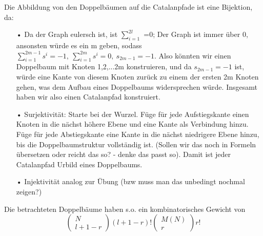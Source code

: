 \documentclass[a4paper, 11pt]{scrreprt}
\newcommand{\NN}{\mathbb{N}}
\begin{document}
Die Abbildung von den Doppelbäumen auf die Catalanpfade ist eine Bijektion, da:
\begin{itemize}
 \item[•]Da der Graph eulersch ist, ist $ \sum_{i=1}^{2l} $ =0; Der Graph ist immer über 0, ansonsten würde es ein m geben, sodass $ \sum_{i=1}^{2m-1}s^{i}=-1, ~\sum_{i=1}^{2m}s^{i}=0, ~ s_{2m-1}=-1  $. Also könnten wir einen Doppelbaum mit Knoten {1,2,...2m} konstruieren, und da $ s_{2m-1}=-1  $ ist, würde eine Kante von diesem Knoten zurück zu einem der ersten 2m Knoten gehen, was dem Aufbau eines Doppelbaums widersprechen würde. Insgesamt haben wir also einen Catalanpfad konstruiert. 
 \item[•] Surjektivität: Starte bei der Wurzel. Füge für jede Aufstiegskante einen Knoten in die nächst höhere Ebene und eine Kante als Verbindung hinzu. Füge für jede Abstiegskante eine Kante in die nächst niedrigere Ebene hinzu, bis die Doppelbaumstruktur vollständig ist. (Sollen wir das noch in Formeln übersetzen oder reicht das so? - denke das passt so). Damit ist jeder Catalanpfad Urbild eines Doppelbaums. 
\item[•] Injektivität analog zur Übung (bzw muss man das unbedingt nochmal zeigen?)\\
\end{itemize}
Die betrachteten Doppelbäume haben s.o. ein kombinatorisches Gewicht von 
	\begin{equation}
		\begin{pmatrix} N\\ l+1-r\end{pmatrix} (l+1-r)! \begin{pmatrix} M(N)\\r\end{pmatrix} r!
	\end{equation}
\end{document}
